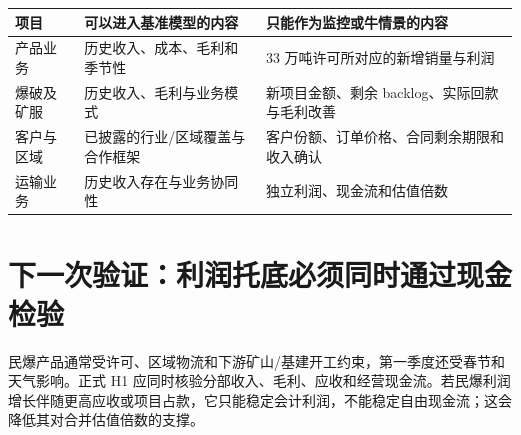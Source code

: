 \begin{exhibitbox}[表 4-2：民爆防御性信用的准入规则]
\begin{tabularx}{\exhibitboxwidth}{L{3.5cm}X X}
\toprule
项目 & 可以进入基准模型的内容 & 只能作为监控或牛情景的内容 \\
\midrule
产品业务 & 历史收入、成本、毛利和季节性 & 33 万吨许可所对应的新增销量与利润 \\
爆破及矿服 & 历史收入、毛利与业务模式 & 新项目金额、剩余 backlog、实际回款与毛利改善 \\
客户与区域 & 已披露的行业/区域覆盖与合作框架 & 客户份额、订单价格、合同剩余期限和收入确认 \\
运输业务 & 历史收入存在与业务协同性 & 独立利润、现金流和估值倍数 \\
\bottomrule
\end{tabularx}
\end{exhibitbox}

\section{下一次验证：利润托底必须同时通过现金检验}

民爆产品通常受许可、区域物流和下游矿山/基建开工约束，第一季度还受春节和天气影响。正式 H1 应同时核验分部收入、毛利、应收和经营现金流。若民爆利润增长伴随更高应收或项目占款，它只能稳定会计利润，不能稳定自由现金流；这会降低其对合并估值倍数的支撑。

